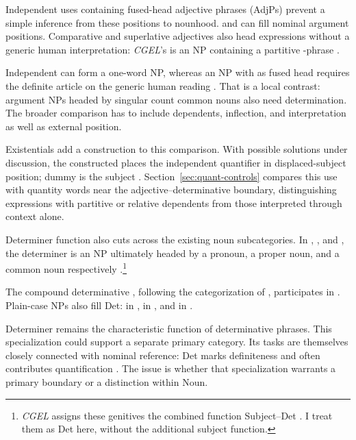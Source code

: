 \documentclass[12pt]{article}
\begin{document}
Independent uses containing fused-head adjective phrases (AdjPs) prevent a simple inference from these positions to nounhood.  and  can fill nominal argument positions. Comparative and superlative adjectives also head expressions without a generic human interpretation: \textit{CGEL}'s  is an NP containing a partitive -phrase \citep[332--333, 416--423]{huddleston2002}.

Independent  can form a one-word NP, whereas an NP with  as fused head requires the definite article  on the generic human reading \citep[417--418]{huddleston2002}. That is a local contrast: argument NPs headed by singular count common nouns also need determination. The broader comparison has to include dependents, inflection, and interpretation as well as external position.

Existentials add a construction to this comparison. With possible solutions under discussion, the constructed  places the independent quantifier in displaced-subject position; dummy  is the subject \citep[1391--1393]{huddleston2002}. Section~\ref{sec:quant-controls} compares this use with quantity words near the adjective--determinative boundary, distinguishing expressions with partitive or relative dependents from those interpreted through context alone.

Determiner function also cuts across the existing noun subcategories. In , , and , the determiner is an NP ultimately headed by a pronoun, a proper noun, and a common noun respectively \citep[354--355, 470--471]{huddleston2002}.\footnote{\textit{CGEL} assigns these genitives the combined function Subject--Det \citep[472--473]{huddleston2002}. I treat them as Det here, without the additional subject function.}

The compound determinative , following the categorization of \textcite[§1.3]{Payne2007}, participates in . Plain-case NPs also fill Det:  in ,  in , and  in  \citep[356]{huddleston2002}.

Determiner remains the characteristic function of determinative phrases. This specialization could support a separate primary category. Its tasks are themselves closely connected with nominal reference: Det marks definiteness and often contributes quantification \citep[354--359]{huddleston2002}. The issue is whether that specialization warrants a primary boundary or a distinction within Noun.
\end{document}
